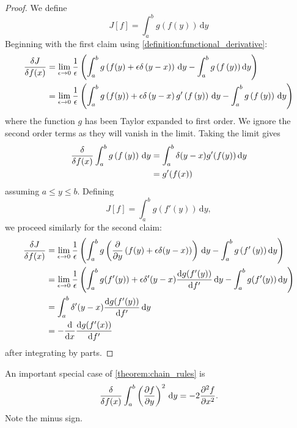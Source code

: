 \begin{proof}
  We define
  \begin{equation*}
    J[f] = \int_a^b g\left(f\left(y\right)\right)\,\mathrm{d}y
  \end{equation*}
  Beginning with the first claim using \cref{definition:functional_derivative}:
  \begin{align*}
    \fdv{J}{f(x)}  &= \lim_{\epsilon\rightarrow 0} \frac{1}{\epsilon} \left(\int_a^b g\left(f(y) + \epsilon \delta\left(y-x\right)\right)\,\mathrm{d}y
                                                                     - \int_a^b g\left(f\left(y\right)\right)\mathrm{d}y \right)\\
    &=  \lim_{\epsilon\rightarrow 0} \frac{1}{\epsilon} \left(\int_a^b g\left(f(y)\right) + \epsilon \delta\left(y-x\right)g'\left(f\left(y\right)\right)\,\mathrm{d}y
                                                                     - \int_a^b g\left(f\left(y\right)\right)\,\mathrm{d}y\right)
  \end{align*}
  where the function $g$ has been Taylor expanded to first order. We ignore the second order terms as they will vanish in the limit.
  Taking the limit gives
  \begin{align*}
    \fdv{f(x)} \int_a^b g\left(f\left(y\right)\right)\,\mathrm{d}y &= \int_a^b \delta(y - x) g'(f(y))\,\mathrm{d}y \\
                                                                   &= g'(f(x))                                                              
  \end{align*}
  assuming $a \leq y \leq b$.
  Defining
  \begin{equation*}
    J[f] =  \int_a^b g\left(f'\left(y\right)\right)\,\mathrm{d}y,
  \end{equation*}
  we proceed similarly for the second claim:
  \begin{align*}
    \fdv{J}{f(x)}  &= \lim_{\epsilon\rightarrow 0} \frac{1}{\epsilon}\left(\int_a^b g\left(\pdv{y}\left(f(y) + \epsilon \delta (y-x)\right)\right)\, \mathrm{d}y- \int_a^b g \left( f' \left( y \right) \right)\mathrm{d}y\right)       \\
                                                                    &= \lim_{\epsilon\rightarrow 0} \frac{1}{\epsilon}\left(\int_a^b g(f'(y)) + \epsilon \delta' (y-x)\dv{g(f'(y))}{f'}\, \mathrm{d}y- \int_a^b g(f'(y))\,\mathrm{d}y\right) \\
                                                                    &= \int_a^b \delta' (y-x)\dv{g(f'(y))}{f'}\, \mathrm{d}y \\
    &= - \dv{x} \dv{g(f'(x))}{f'}
  \end{align*}
  after integrating by parts.
\end{proof}

An important special case of \cref{theorem:chain_rules} is
\begin{equation}
  \label{eq:derivative_of_squared_derivative}
  \fdv{f(x)}\int_a^b \left(\pdv{f}{y}\right)^2\,\mathrm{d}y = - 2 \pdv[2]{f}{x}.
\end{equation}
Note the minus sign.